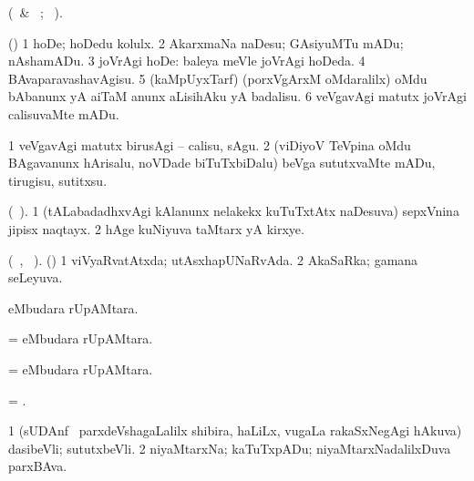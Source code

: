 \bentry
{} 
\gl{\kirx} 
\bmng
(\BU\ \& \BUkaq\ ; \vakaq\ ). 
\emng

\noindent
\gl{\sakirx} 
\bmng
(\ashi) 
\bnum
\num{1} hoDe; hoDedu kolulx. 
\num{2} AkarxmaNa naDesu; GAsiyuMTu mADu; nAshamADu.
\num{3} joVrAgi hoDe:  baleya meVle joVrAgi hoDeda. 
\num{4} BAvaparavashavAgisu.   
\num{5} (kaMpUyxTarf) (porxVgArxM oMdaralilx) oMdu bAbanunx yA aiTaM anunx aLisihAku yA badalisu. 
\num{6} veVgavAgi matutx joVrAgi calisuvaMte mADu.
\enum
\emng

\noindent
\gl{\akirx}  
\bmng
\bnum
\num{1} veVgavAgi matutx birusAgi -- calisu, sAgu. 
\num{2} (viDiyoV TeVpina oMdu BAgavanunx hArisalu, noVDade biTuTxbiDalu) beVga sututxvaMte mADu, tirugisu, sutitxsu.
\enum
\emng
\eentry

\bentry
{} 
\gl{\nA} 
\bmng
(\bava\ ). 
\bnum
\num{1} (tALabadadhxvAgi kAlanunx nelakekx kuTuTxtAtx naDesuva) sepxVnina jipisx naqtayx. 
\num{2} hAge kuNiyuva taMtarx yA kirxye.
\enum
\emng
\eentry

\bentry
{} 
\gl{\gu} 
\bmng
(\tara\ , \tama\ ). (\AmA)
\bnum 
\num{1} viVyaRvatAtxda; utAsxhapUNaRvAda. 
\num{2} AkaSaRka; gamana seLeyuva.
\enum
\emng
\eentry

\bentry
{} 
\gl{\saMkiSx} 
\bmng
{}
\emng
\eentry

\bentry
{} 
\gl{\nA} 
\bmng
{} eMbudara rUpAMtara.
\emng
\eentry

\bentry
{} 
\gl{\gu}
\bmng
=  eMbudara rUpAMtara.
\emng
\eentry

\bentry
{} 
\gl{\nA}
\bmng
=  eMbudara rUpAMtara.
\emng
\eentry

\bentry
{} 
\gl{\nA} 
\bmng
= .
\emng
\eentry

\bentry
{} 
\gl{\nA}
\bmng
\bnum
\num{1} (sUDAnf \mo\ parxdeVshagaLalilx shibira,  haLiLx,  \mo vugaLa  rakaSxNegAgi hAkuva) dasibeVli; sututxbeVli. 
\num{2} niyaMtarxNa; kaTuTxpADu; niyaMtarxNadalilxDuva parxBAva.
\enum
\emng
\eentry


